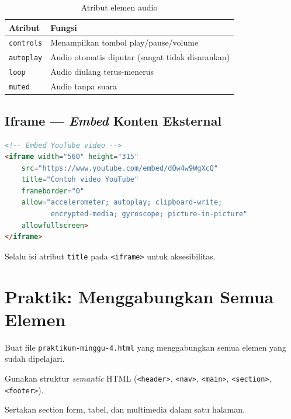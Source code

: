 \begin{table}[ht]
\centering
\caption{Atribut elemen audio}
\label{tab:m04-audio}
\begin{tabular}{lp{8cm}}
\toprule
\textbf{Atribut} & \textbf{Fungsi} \\
\midrule
\texttt{controls} & Menampilkan tombol play/pause/volume \\
\texttt{autoplay} & Audio otomatis diputar (sangat tidak disarankan) \\
\texttt{loop} & Audio diulang terus-menerus \\
\texttt{muted} & Audio tanpa suara \\
\bottomrule
\end{tabular}
\end{table}

\subsection{Iframe --- \emph{Embed} Konten Eksternal}

\begin{lstlisting}[language=HTML, caption={Menyisipkan video YouTube via iframe}, label={lst:m04-iframe}]
<!-- Embed YouTube video -->
<iframe width="560" height="315"
    src="https://www.youtube.com/embed/dQw4w9WgXcQ"
    title="Contoh video YouTube"
    frameborder="0"
    allow="accelerometer; autoplay; clipboard-write;
           encrypted-media; gyroscope; picture-in-picture"
    allowfullscreen>
</iframe>
\end{lstlisting}

\begin{peringatan}
Selalu isi atribut \texttt{title} pada \texttt{<iframe>} untuk aksesibilitas.
\end{peringatan}

\section{Praktik: Menggabungkan Semua Elemen}
\label{sec:m04-gabung}

\begin{langkah}
  \item Buat file \texttt{praktikum-minggu-4.html} yang menggabungkan semua elemen yang sudah dipelajari.
  \item Gunakan struktur \emph{semantic} HTML (\texttt{<header>}, \texttt{<nav>}, \texttt{<main>}, \texttt{<section>}, \texttt{<footer>}).
  \item Sertakan section form, tabel, dan multimedia dalam satu halaman.
\end{langkah}

